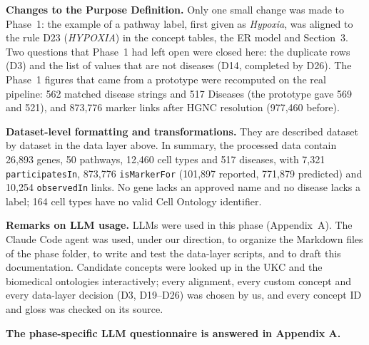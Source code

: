 \noindent\textbf{Changes to the Purpose Definition.} Only one small change was made to Phase~1: the example of a pathway label, first given as \emph{Hypoxia}, was aligned to the rule D23 (\emph{HYPOXIA}) in the concept tables, the ER model and Section~3. Two questions that Phase~1 had left open were closed here: the duplicate rows (D3) and the list of values that are not diseases (D14, completed by D26). The Phase~1 figures that came from a prototype were recomputed on the real pipeline: 562 matched disease strings and 517 Diseases (the prototype gave 569 and 521), and 873,776 marker links after HGNC resolution (977,460 before).

\noindent\textbf{Dataset-level formatting and transformations.} They are described dataset by dataset in the data layer above. In summary, the processed data contain 26,893 genes, 50 pathways, 12,460 cell types and 517 diseases, with 7,321 \texttt{participatesIn}, 873,776 \texttt{isMarkerFor} (101,897 reported, 771,879 predicted) and 10,254 \texttt{observedIn} links. No gene lacks an approved name and no disease lacks a label; 164 cell types have no valid Cell Ontology identifier.

\noindent\textbf{Remarks on LLM usage.} LLMs were used in this phase (Appendix~A). The Claude Code agent was used, under our direction, to organize the Markdown files of the phase folder, to write and test the data-layer scripts, and to draft this documentation. Candidate concepts were looked up in the UKC and the biomedical ontologies interactively; every alignment, every custom concept and every data-layer decision (D3, D19--D26) was chosen by us, and every concept ID and gloss was checked on its source.

\noindent\textbf{The phase-specific LLM questionnaire is answered in Appendix A.}
